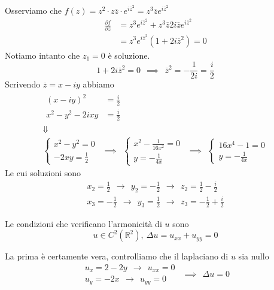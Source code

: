 Osserviamo che $f\left( z\right) =z^{2} \cdotp z\overline{z} \cdotp e^{i\overline{z}^{2}} =z^{3}\overline{z} e^{i\overline{z}^{2}}$
\begin{align*}
\frac{\partial f}{\partial \overline{z}} & =z^{3} e^{i\overline{z}^{2}} +z^{3}\overline{z} 2i\overline{z} e^{i\overline{z}^{2}}\\
 & =z^{3} e^{i\overline{z}^{2}}\left( 1+2i\overline{z}^{2}\right) =0
\end{align*}
Notiamo intanto che $z_{1} =0$ è soluzione.
\begin{equation*}
1+2i\overline{z}^{2} =0\ \ \implies \ \ \overline{z}^{2} =-\frac{1}{2i} =\frac{i}{2}
\end{equation*}
Scrivendo $\overline{z} =x-iy$ abbiamo
\begin{gather*}
\begin{aligned}
\left( x-iy\right)^{2} & =\frac{i}{2}\\
x^{2} -y^{2} -2ixy & =\frac{i}{2}
\end{aligned}\\
\Downarrow \\
\begin{cases}
x^{2} -y^{2} =0\\
-2xy=\frac{1}{2}
\end{cases} \ \ \implies \ \ \begin{cases}
x^{2} -\frac{1}{16x^{2}} =0\\
y=-\frac{1}{4x}
\end{cases} \ \ \implies \ \ \begin{cases}
16x^{4} -1=0\\
y=-\frac{1}{4x}
\end{cases}
\end{gather*}
Le cui soluzioni sono
\begin{gather*}
x_{2} =\frac{1}{2} \ \ \rightarrow \ \ y_{2} =-\frac{1}{2} \ \ \rightarrow \ \ z_{2} =\frac{1}{2} -\frac{i}{2}\\
x_{3} =-\frac{1}{2} \ \ \rightarrow \ \ y_{3} =\frac{1}{2} \ \ \rightarrow \ \ z_{3} =-\frac{1}{2} +\frac{i}{2}
\end{gather*}
\Soluzione
\begin{defn}
Le condizioni che verificano l'armonicità di $u$ sono
\begin{equation}
u\in C^{2}\left(\mathbb{R}^{2}\right) ,\ \Delta u=u_{xx} +u_{yy} =0
\end{equation}
\end{defn}
La prima è certamente vera, controlliamo che il laplaciano di $u$ sia nullo
\begin{equation*}
\begin{array}{ r }
u_{x} =2-2y\ \ \rightarrow \ \ u_{xx} =0\\
u_{y} =-2x\ \ \rightarrow \ \ u_{yy} =0
\end{array} \ \ \implies \ \ \Delta u=0
\end{equation*}
